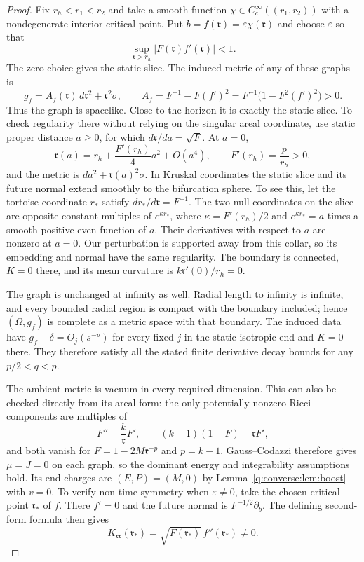 \begin{proof}
Fix $r_h<r_1<r_2$ and take a smooth function
$\chi\in C_c^\infty((r_1,r_2))$ with a nondegenerate interior critical
point.  Put $b=f(\mathfrak r)=\varepsilon\chi(\mathfrak r)$ and choose
$\varepsilon$ so that
\begin{equation}
 \sup_{\mathfrak r>r_h}|F(\mathfrak r)f'(\mathfrak r)|<1.
 \label{q:converse:eq:radial-spacelike}
\end{equation}
The zero choice gives the static slice.  The induced metric of any of
these graphs is
\begin{equation}
 g_f=A_f(\mathfrak r)\,d\mathfrak r^2+\mathfrak r^2\sigma,
 \qquad
 A_f=F^{-1}-F(f')^2
     =F^{-1}\bigl(1-F^2(f')^2\bigr)>0.
 \label{q:converse:eq:radial-metric}
\end{equation}
Thus the graph is spacelike.  Close to the horizon it is exactly the
static slice.  To check regularity there without relying on the
singular areal coordinate, use static proper distance $a\ge0$, for
which $d\mathfrak r/da=\sqrt F$.  At $a=0$,
\[
 \mathfrak r(a)
 =r_h+\frac{F'(r_h)}4a^2+O(a^4),\qquad F'(r_h)=\frac p{r_h}>0,
\]
and the metric is $da^2+\mathfrak r(a)^2\sigma$.
In Kruskal coordinates the static slice and its future normal extend
smoothly to the bifurcation sphere.  To see this, let the tortoise
coordinate $r_*$ satisfy $dr_*/d\mathfrak r=F^{-1}$.
The two null coordinates on the slice are opposite constant multiples of
$e^{\kappa r_*}$, where $\kappa=F'(r_h)/2$ and
$e^{\kappa r_*}=a$ times a smooth positive even function of $a$.
Their derivatives with respect to $a$ are nonzero at $a=0$.
Our perturbation is supported away from this collar, so its embedding
and normal have the same regularity.  The boundary is connected,
$K=0$ there, and its mean curvature is
$k\mathfrak r'(0)/r_h=0$.

The graph is unchanged at infinity as well.  Radial length to infinity
is infinite, and every bounded radial region is compact with the
boundary included; hence $(\Omega,g_f)$ is complete as a metric space
with that boundary.  The induced data have
$g_f-\delta=O_j(s^{-p})$ for every fixed $j$ in the static isotropic
end and $K=0$ there.  They therefore satisfy all the stated finite
derivative decay bounds for any $p/2<q<p$.

The ambient metric is vacuum in every required dimension.  This can
also be checked directly from its areal form: the only potentially
nonzero Ricci components are multiples of
\[
 F''+\frac{k}{\mathfrak r}F',\qquad
 (k-1)(1-F)-\mathfrak rF',
\]
and both vanish for $F=1-2M\mathfrak r^{-p}$ and $p=k-1$.
Gauss--Codazzi therefore gives $\mu=J=0$ on each graph, so the dominant
energy and integrability assumptions hold.  Its end charges are
$(E,P)=(M,0)$ by Lemma~\ref{q:converse:lem:boost} with $v=0$.
To verify non-time-symmetry when $\varepsilon\ne0$, take the chosen
critical point $\mathfrak r_*$ of $f$.  There $f'=0$ and the future
normal is $F^{-1/2}\partial_b$.  The defining second-form formula
then gives
\[
 K_{\mathfrak r\mathfrak r}(\mathfrak r_*)
   =\sqrt{F(\mathfrak r_*)}\,f''(\mathfrak r_*)\ne0.
\]


\end{proof}
